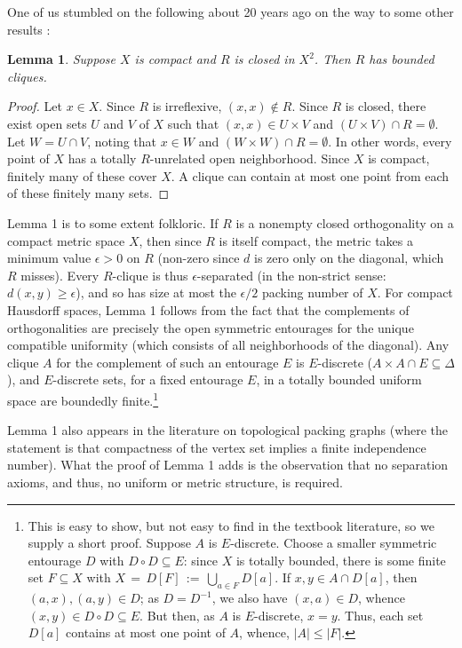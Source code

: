 \documentclass[12pt]{article}
\theoremstyle{plain}
\newtheorem{lemma}{Lemma}
\theoremstyle{definition}
\theoremstyle{remark}
\begin{document}
One of us stumbled on the following about 20 years ago on the way to some other results { \cite{WiTT, Wi}}:

\begin{lemma}\label{compactbounded}
Suppose $X$ is compact and $R$ is closed in $X^2$. Then $R$ has bounded cliques.
\end{lemma}

\begin{proof}
Let $x \in X$. Since $R$ is irreflexive, $(x,x) \not\in R$. Since $R$ is closed, there exist open sets $U$ and $V$ of $X$ such that $(x,x) \in U \times V$ and $(U \times V) \cap R = \emptyset$. Let $W = U \cap V$, noting that $x \in W$ and $(W \times W) \cap R = \emptyset$. In other words, every point of $X$ has a totally $R$-unrelated open neighborhood. Since $X$ is compact, finitely many of these cover $X$. A clique can contain at most one point from each of these finitely many sets.
\end{proof}
 

Lemma 1 is to some extent folkloric. 
If $R$ is a nonempty closed orthogonality on a compact 
metric space $X$, then since $R$ is itself compact, 
the metric takes a minimum value $\epsilon > 0$ on $R$ (non-zero since $d$ is zero only on the diagonal, which $R$ misses). Every $R$-clique is thus $\epsilon$-separated (in the non-strict sense: $d(x,y) \geq \epsilon$), and so has size at most the  $\epsilon/2$ packing number of $X$. For compact Hausdorff spaces, Lemma 1 follows from the fact that the complements of orthogonalities are precisely the open symmetric entourages for the unique compatible uniformity (which 
consists of all neighborhoods of the diagonal). Any clique $A$ for the complement of such an entourage $E$ is $E$-discrete ($A \times A \cap E \subseteq \Delta$), and $E$-discrete sets, for a fixed entourage $E$, in a totally bounded uniform space are boundedly finite.\footnote{This is easy to show, but not easy to find in the textbook literature, so we supply a 
short proof. Suppose $A$ is $E$-discrete. Choose a smaller symmetric entourage $D$ with $D \circ D \subseteq E$: since $X$ is totally bounded, there is some finite set $F \subseteq X$ with $X \, = \, D[F] \, := \, \bigcup_{a \in F} D[a]$. If $x,y \in A \cap D[a]$, then $(a,x), (a,y) \in D$; as $D = D^{-1}$, we also have $(x,a) \in D$, whence $(x,y) \in D \circ D \subseteq E$. But then, as $A$ is $E$-discrete, $x = y$. Thus, each set $D[a]$ contains at most one point of $A$, whence, $|A| \leq |F|$.}

Lemma 1 also appears in the literature on topological packing graphs \cite{dLV} (where the statement is that compactness of the vertex set implies a finite independence number). What the proof of Lemma 1 adds is the observation that no separation axioms, and thus, no 
uniform or metric structure, is required. \\ 
\end{document}
